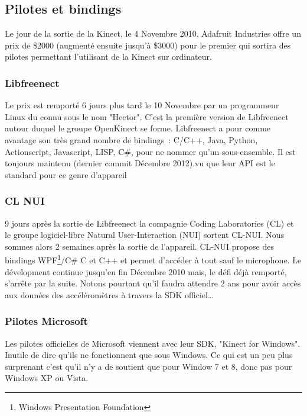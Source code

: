 \documentclass[french,12pt]{report}
\begin{document}
  \subsection{Pilotes et bindings}
  Le jour de la sortie de la Kinect, le 4 Novembre 2010, Adafruit Industries 
  offre un prix de \$2000 (augmenté ensuite jusqu'à \$3000) pour le premier qui
  sortira des pilotes permettant l'utilisant de la Kinect sur ordinateur.
  \subsubsection{Libfreenect}
  Le prix est remporté 6 jours plus tard le 10 Novembre par un programmeur Linux
  du connu sous le nom "Hector". C'est la première version de Libfreenect autour
  duquel le groupe OpenKinect se forme. Libfreenect a pour comme avantage son
  très grand nombre de bindings~: C/C++, Java, Python, Actionscript, Javascript,
  LISP, C\#, pour ne nommer qu'un sous-ensemble. 
  Il est toujours maintenu (dernier commit Décembre 2012).vu
  que leur API est le standard pour ce genre d'appareil 
  \subsubsection{CL NUI}
  9 jours après la sortie de Libfreenect la compagnie Coding Laboratories 
  (CL) et le groupe logiciel-libre
  Natural User-Interaction (NUI) sortent CL-NUI. Nous sommes alors 2 semaines 
  après la sortie de l'appareil. CL-NUI propose des bindings 
  WPF\footnote{Windows Presentation Foundation}/C\# C et C++ et permet d'accéder 
  à tout sauf le microphone. Le dévelopment continue jusqu'en fin Décembre 2010 
  mais,
  le défi déjà remporté, s'arrête par la suite. Notons pourtant qu'il faudra 
  attendre 2 ans pour avoir accès aux données des accéléromètres à travers la 
  SDK officiel\ldots
  \subsubsection{Pilotes Microsoft}  
  Les pilotes officielles de Microsoft viennent avec leur SDK, "Kinect for 
  Windows". Inutile de dire
  qu'ils ne fonctionnent que sous Windows. Ce qui est un peu plus surprenant 
  c'est qu'il n'y a de soutient que pour Window 7 et 8, donc pas pour Windows XP 
  ou Vista.
\end{document}
